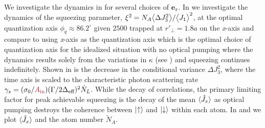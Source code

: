 \documentclass[preprint,aps,pra,onecolumn]{revtex4-1} %
\newcommand{\qaxis}{\mathbf{e}_\pi}
\newcommand{\varz}{\Delta J_3^2}
\newcommand{\comment}[1]{{\color{Maroon} #1}}
\begin{document}
We investigate the dynamics in  for several choices of $\qaxis$. 
In  we investigate the dynamics of the squeezing parameter, $ \xi^{2}=N_A \big\langle \Delta J_3^2 \big\rangle/\big\langle J_1 \big\rangle^2 $, at the optimal quantization axis $\phi_q\approx 86.2^\circ$ given $ 2500 $ trapped at $ r'\!_\perp=1.8a $ on the \emph{x}-axis and compare to using \emph{x}-axis as the quantization axis which is the optimal choice of quantization axis for the idealized situation with no optical pumping where the dynamics results solely from the variations in $\kappa$ (see ) and squeezing continues indefinitely.
Shown in  is the decrease in the conditional variance $\varz$, where the time axis is scaled to the characteristic photon scattering rate $\gamma_s = (\sigma_0/\comment{A_{\rm in}})(\Gamma/2 \Delta_\eff)^2 \dot{N}_L$. 
While the decay of correlations, the primary limiting factor for peak achievable squeezing is the decay of the mean $\langle{\hat{J}_x}\rangle$ as optical pumping destroys the coherence between $\lvert{\uparrow}\rangle$ and $\lvert{\downarrow}\rangle$ within each atom. 
In  and  we plot $\langle{\hat{J}_x}\rangle$ and the atom number $\tilde{N}_A$.  
\end{document}
